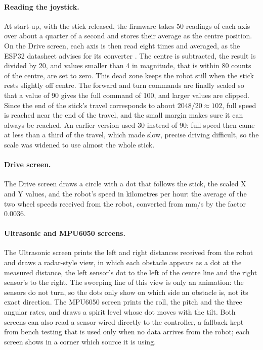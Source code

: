 \paragraph{Reading the joystick.} At start-up, with the stick released, the firmware takes
50 readings of each axis over about a quarter of a second and stores their average as the
centre position. On the Drive screen, each axis is then read eight times and averaged, as
the ESP32 datasheet advises for its converter \cite{esp32_datasheet}. The centre is
subtracted, the result is divided by 20, and values smaller than 4 in magnitude, that is
within 80 counts of the centre, are set to zero. This dead zone keeps the robot still
when the stick rests slightly off centre. The forward and turn commands are finally
scaled so that a value of 90 gives the full command of 100, and larger values are
clipped. Since the end of the stick's travel corresponds to about \(2048/20 \approx 102\),
full speed is reached near the end of the travel, and the small margin makes sure it can
always be reached. An earlier version used 30 instead of 90: full speed then came at
less than a third of the travel, which made slow, precise driving difficult, so the
scale was widened to use almost the whole stick.

\paragraph{Drive screen.} The Drive screen draws a circle with a dot that follows the
stick, the scaled X and Y values, and the robot's speed in kilometres per hour: the
average of the two wheel speeds received from the robot, converted from mm/s by the
factor 0.0036.

\paragraph{Ultrasonic and MPU6050 screens.} The Ultrasonic screen prints the left and right
distances received from the robot and draws a radar-style view, in which each obstacle
appears as a dot at the measured distance, the left sensor's dot to the left of the
centre line and the right sensor's to the right. The sweeping line of this view is only
an animation: the sensors do not turn, so the dots only show on which side an obstacle
is, not its exact direction. The MPU6050 screen prints the roll, the pitch and the three angular rates,
and draws a spirit level whose dot moves with the tilt. Both screens can also read a
sensor wired directly to the controller, a fallback kept from bench testing that is used
only when no data arrives from the robot; each screen shows in a corner which source it is
using.

